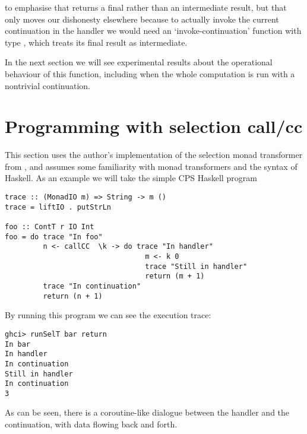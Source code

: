 \documentclass{article}
\begin{document}
to emphasise that  returns a final rather than an intermediate result, but that only moves our dishonesty elsewhere because to actually invoke the current continuation in the handler we would need an `invoke-continuation' function with type , which treats its final result as intermediate.

In the next section we will see experimental results about the operational behaviour of this function, including when the whole computation is run with a nontrivial continuation.

\section{Programming with selection call/cc}\label{callcc2}


This section uses the author's implementation of the selection monad transformer from \citep{hedges14}, and assumes some familiarity with monad transformers and the syntax of Haskell. As an example we will take the simple CPS Haskell program
\begin{verbatim}
trace :: (MonadIO m) => String -> m ()
trace = liftIO . putStrLn

foo :: ContT r IO Int
foo = do trace "In foo"
         n <- callCC  \k -> do trace "In handler"
                                 m <- k 0
                                 trace "Still in handler"
                                 return (m + 1)
         trace "In continuation"
         return (n + 1)
\end{verbatim}
By running this program we can see the execution trace:
\begin{verbatim}
ghci> runSelT bar return
In bar
In handler
In continuation
Still in handler
In continuation
3
\end{verbatim}
As can be seen, there is a coroutine-like dialogue between the handler and the continuation, with data flowing back and forth.
\end{document}
